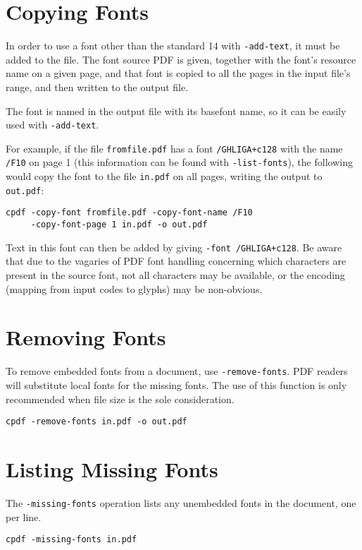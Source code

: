 \documentclass{book}
\begin{document}
\section{Copying Fonts}
\label{copyfont}

In order to use a font other than the standard 14 with \verb!-add-text!, it
must be added to the file. The font source PDF is given, together with the
font's resource name on a given page, and that font is copied to all the pages
in the input file's range, and then written to the output file.

The font is named in the output file with its basefont name, so it can be
easily used with \verb!-add-text!.

For example, if the file \verb!fromfile.pdf! has a font \verb!/GHLIGA+c128! with
the name \verb!/F10! on page 1 (this information can be found with
\verb!-list-fonts!), the following would copy the font to the file
\verb!in.pdf! on all pages, writing the output to \verb!out.pdf!:
  \begin{framed}
  \small\noindent\verb!cpdf -copy-font fromfile.pdf -copy-font-name /F10!\\
  \small\noindent\verb!     -copy-font-page 1 in.pdf -o out.pdf!
  \end{framed}

\noindent Text in this font can then be added by giving \verb!-font /GHLIGA+c128!. Be
aware that due to the vagaries of PDF font handling concerning which characters
are present in the source font, not all characters may be available, or the
encoding (mapping from input codes to glyphs) may be non-obvious.

\section{Removing Fonts}
\label{removefont}

To remove embedded fonts from a document, use \verb!-remove-fonts!. PDF readers will
substitute local fonts for the missing fonts. The use of this function is only
recommended when file size is the sole consideration.

  \begin{framed}
  \small\noindent\verb!cpdf -remove-fonts in.pdf -o out.pdf!
  \vspace{2.5mm}
  \end{framed}

\section{Listing Missing Fonts}
  The \verb!-missing-fonts! operation lists any unembedded fonts in the document, one per line.
  \begin{framed}
  \small\noindent\verb!cpdf -missing-fonts in.pdf!
  \vspace{2.5mm}
  \end{framed}
\end{document}
